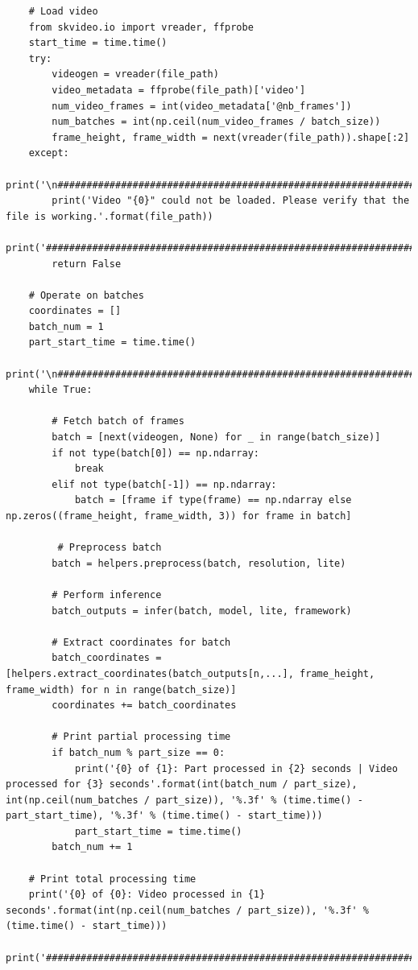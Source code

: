 \documentclass{fisatprojectfinal}
\begin{document}
\begin{appendices}
\begin{lstlisting}
    # Load video
    from skvideo.io import vreader, ffprobe
    start_time = time.time()
    try:
        videogen = vreader(file_path)
        video_metadata = ffprobe(file_path)['video']
        num_video_frames = int(video_metadata['@nb_frames'])
        num_batches = int(np.ceil(num_video_frames / batch_size))
        frame_height, frame_width = next(vreader(file_path)).shape[:2]
    except:
        print('\n##########################################################################################################')
        print('Video "{0}" could not be loaded. Please verify that the file is working.'.format(file_path))
        print('##########################################################################################################\n')
        return False
    
    # Operate on batches
    coordinates = []
    batch_num = 1
    part_start_time = time.time()
    print('\n##########################################################################################################')
    while True:

        # Fetch batch of frames
        batch = [next(videogen, None) for _ in range(batch_size)]
        if not type(batch[0]) == np.ndarray:
            break
        elif not type(batch[-1]) == np.ndarray:
            batch = [frame if type(frame) == np.ndarray else np.zeros((frame_height, frame_width, 3)) for frame in batch]

         # Preprocess batch
        batch = helpers.preprocess(batch, resolution, lite)

        # Perform inference
        batch_outputs = infer(batch, model, lite, framework)

        # Extract coordinates for batch
        batch_coordinates = [helpers.extract_coordinates(batch_outputs[n,...], frame_height, frame_width) for n in range(batch_size)]
        coordinates += batch_coordinates

        # Print partial processing time
        if batch_num % part_size == 0:
            print('{0} of {1}: Part processed in {2} seconds | Video processed for {3} seconds'.format(int(batch_num / part_size), int(np.ceil(num_batches / part_size)), '%.3f' % (time.time() - part_start_time), '%.3f' % (time.time() - start_time)))
            part_start_time = time.time()    
        batch_num += 1
    
    # Print total processing time
    print('{0} of {0}: Video processed in {1} seconds'.format(int(np.ceil(num_batches / part_size)), '%.3f' % (time.time() - start_time)))
    print('##########################################################################################################\n')
    

\end{lstlisting}
\end{appendices}
\end{document}
